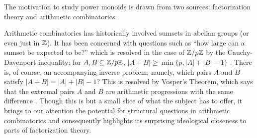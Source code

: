 

The motivation to study power monoids is drawn from two sources: factorization theory and arithmetic combinatorics.

Arithmetic combinatorics has historically involved sumsets in abelian groups (or even just in $\mathbb{Z}$).
It has been concerned with questions such as ``how large can a sumset be expected to be?'' which is resolved in the case of $\mathbb{Z}/p\mathbb{Z}$ by the Cauchy-Davenport inequality: for $A,B\subseteq \mathbb{Z}/p\mathbb{Z}$, $|A+B| \ge \min\{p,|A| + |B| -1\}$ \cite[Theorem 6.2]{grynkiewicz13}.
There is, of course, an accompanying inverse problem; namely, which pairs $A$ and $B$ satisfy $|A+B| = |A|+|B|-1$?
This is resolved by Vosper's Theorem, which says that the extremal pairs $A$ and $B$ are arithmetic progressions with the same difference \cite[Theorem 8.1]{grynkiewicz13}.
Though this is but a small slice of what the subject has to offer, it brings to our attention the potential for structural questions in arithmetic combinatorics and consequently highlights its surprising ideological closeness to parts of factorization theory.  

